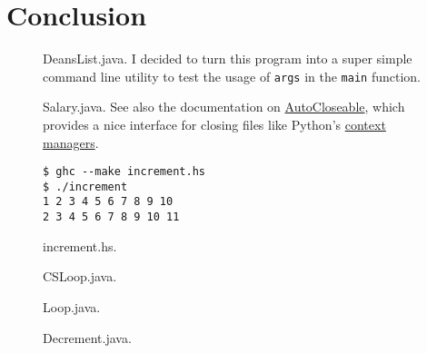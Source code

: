 \documentclass[leqno, 11pt]{article}
\begin{document}
\section*{Conclusion}
\newpage
\begin{figure}
  \centering
  
  \caption{DeansList.java. I decided to turn this program into a super simple command line utility to test the usage of \texttt{args} in the \texttt{main} function.}
  \label{fig:one}
\end{figure}
\begin{figure}
  \centering
  
  \caption{Salary.java. See also the documentation on \href{https://docs.oracle.com/javase/10/docs/api/java/lang/AutoCloseable.html}{AutoCloseable}, which provides a nice interface for closing files like Python's \href{https://docs.python.org/3/reference/compound_stmts.html\#with}{context managers}.}
  \label{fig:two}
\end{figure}
\begin{figure}
  \centering
  
  \begin{verbatim}
$ ghc --make increment.hs
$ ./increment
1 2 3 4 5 6 7 8 9 10
2 3 4 5 6 7 8 9 10 11
  \end{verbatim}
  \caption{increment.hs.}
  \label{fig:four}
\end{figure}
\begin{figure}
  \centering
  
  \caption{CSLoop.java.}
  \label{fig:six}
\end{figure}
\begin{figure}
  \centering
  
  \caption{Loop.java.}
  \label{fig:seven}
\end{figure}
\begin{figure}
  \centering
  
  \caption{Decrement.java.}
  \label{fig:eight}
\end{figure}
\end{document}

